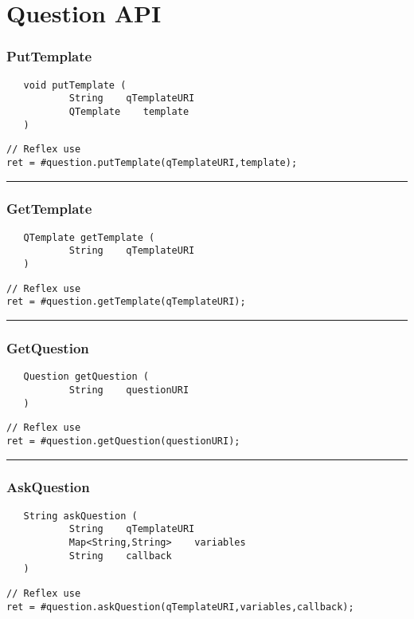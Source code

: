 \section{Question API}

\subsubsection{PutTemplate}
\label{Api:PutTemplate}
\begin{verbatim}
   void putTemplate (
           String    qTemplateURI
           QTemplate    template
   )
\end{verbatim}
\begin{lstlisting}[language=reflex]
// Reflex use
ret = #question.putTemplate(qTemplateURI,template);
\end{lstlisting}



\rule{15cm}{2pt}
\subsubsection{GetTemplate}
\label{Api:GetTemplate}
\begin{verbatim}
   QTemplate getTemplate (
           String    qTemplateURI
   )
\end{verbatim}
\begin{lstlisting}[language=reflex]
// Reflex use
ret = #question.getTemplate(qTemplateURI);
\end{lstlisting}



\rule{15cm}{2pt}
\subsubsection{GetQuestion}
\label{Api:GetQuestion}
\begin{verbatim}
   Question getQuestion (
           String    questionURI
   )
\end{verbatim}
\begin{lstlisting}[language=reflex]
// Reflex use
ret = #question.getQuestion(questionURI);
\end{lstlisting}



\rule{15cm}{2pt}
\subsubsection{AskQuestion}
\label{Api:AskQuestion}
\begin{verbatim}
   String askQuestion (
           String    qTemplateURI
           Map<String,String>    variables
           String    callback
   )
\end{verbatim}
\begin{lstlisting}[language=reflex]
// Reflex use
ret = #question.askQuestion(qTemplateURI,variables,callback);
\end{lstlisting}



